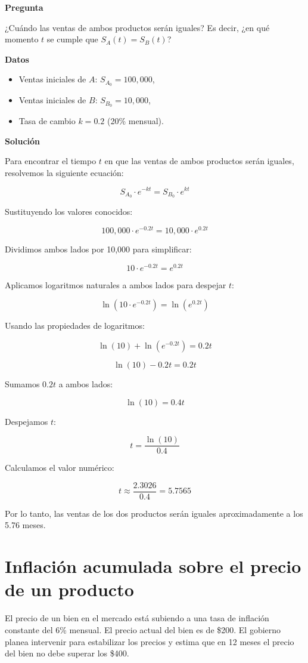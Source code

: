 \documentclass{article}
\begin{document}
\textbf{Pregunta}

¿Cuándo las ventas de ambos productos serán iguales? Es decir, ¿en qué momento \( t \) se cumple que \( S_A(t) = S_B(t) \)?

\textbf{Datos}
\begin{itemize}
    \item Ventas iniciales de \( A \): \( S_{A_0} = 100,000 \),
    \item Ventas iniciales de \( B \): \( S_{B_0} = 10,000 \),
    \item Tasa de cambio \( k = 0.2 \) (20\% mensual).
\end{itemize}

\textbf{Solución}

Para encontrar el tiempo \( t \) en que las ventas de ambos productos serán iguales, resolvemos la siguiente ecuación:

\[
S_{A_0} \cdot e^{-kt} = S_{B_0} \cdot e^{kt}
\]

Sustituyendo los valores conocidos:

\[
100,000 \cdot e^{-0.2t} = 10,000 \cdot e^{0.2t}
\]

Dividimos ambos lados por 10,000 para simplificar:

\[
10 \cdot e^{-0.2t} = e^{0.2t}
\]

Aplicamos logaritmos naturales a ambos lados para despejar \( t \):

\[
\ln(10 \cdot e^{-0.2t}) = \ln(e^{0.2t})
\]

Usando las propiedades de logaritmos:

\[
\ln(10) + \ln(e^{-0.2t}) = 0.2t
\]

\[
\ln(10) - 0.2t = 0.2t
\]

Sumamos \( 0.2t \) a ambos lados:

\[
\ln(10) = 0.4t
\]

Despejamos \( t \):

\[
t = \frac{\ln(10)}{0.4}
\]

Calculamos el valor numérico:

\[
t \approx \frac{2.3026}{0.4} = 5.7565
\]

Por lo tanto, las ventas de los dos productos serán iguales aproximadamente a los 5.76 meses.

\section{Inflación acumulada sobre el precio de un producto}

El precio de un bien en el mercado está subiendo a una tasa de inflación constante del 6\% mensual. El precio actual del bien es de \$200. El gobierno planea intervenir para estabilizar los precios y estima que en 12 meses el precio del bien no debe superar los \$400.
\end{document}
